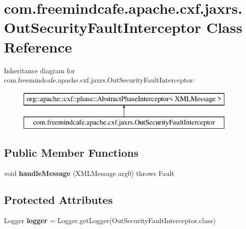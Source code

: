 \hypertarget{classcom_1_1freemindcafe_1_1apache_1_1cxf_1_1jaxrs_1_1_out_security_fault_interceptor}{}\section{com.\+freemindcafe.\+apache.\+cxf.\+jaxrs.\+Out\+Security\+Fault\+Interceptor Class Reference}
\label{classcom_1_1freemindcafe_1_1apache_1_1cxf_1_1jaxrs_1_1_out_security_fault_interceptor}
Inheritance diagram for com.\+freemindcafe.\+apache.\+cxf.\+jaxrs.\+Out\+Security\+Fault\+Interceptor\+:\begin{figure}[H]
\begin{center}
\leavevmode
\includegraphics[height=2.000000cm]{classcom_1_1freemindcafe_1_1apache_1_1cxf_1_1jaxrs_1_1_out_security_fault_interceptor}
\end{center}
\end{figure}
\subsection*{Public Member Functions}
\begin{DoxyCompactItemize}
\item 
\hypertarget{classcom_1_1freemindcafe_1_1apache_1_1cxf_1_1jaxrs_1_1_out_security_fault_interceptor_afa6a538fd4f0227794c67eb291bd8001}{}void {\bfseries handle\+Message} (X\+M\+L\+Message arg0)  throws Fault \label{classcom_1_1freemindcafe_1_1apache_1_1cxf_1_1jaxrs_1_1_out_security_fault_interceptor_afa6a538fd4f0227794c67eb291bd8001}

\end{DoxyCompactItemize}
\subsection*{Protected Attributes}
\begin{DoxyCompactItemize}
\item 
\hypertarget{classcom_1_1freemindcafe_1_1apache_1_1cxf_1_1jaxrs_1_1_out_security_fault_interceptor_a999a38b776b359882cb74dfc334d69ad}{}Logger {\bfseries logger} = Logger.\+get\+Logger(Out\+Security\+Fault\+Interceptor.\+class)\label{classcom_1_1freemindcafe_1_1apache_1_1cxf_1_1jaxrs_1_1_out_security_fault_interceptor_a999a38b776b359882cb74dfc334d69ad}

\end{DoxyCompactItemize}



